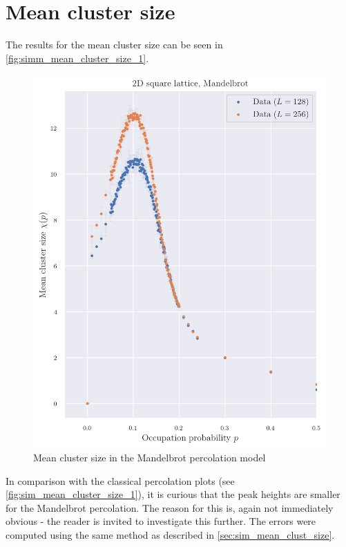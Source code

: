 \section{Mean cluster size}

The results for the mean cluster size can be seen in \autoref{fig:simm_mean_cluster_size_1}. 

\begin{figure}[H]
  \includegraphics[width=\linewidth]{Images/simm_mean_cluster_size_1.png}
  \caption{Mean cluster size in the Mandelbrot percolation model}
  \label{fig:simm_mean_cluster_size_1}
\end{figure}

In comparison with the classical percolation plots (see \autoref{fig:sim_mean_cluster_size_1}), it is curious that the peak heights are smaller for the Mandelbrot percolation. The reason for this is, again not immediately obvious - the reader is invited to investigate this further.
The errors were computed using the same method as described in \autoref{sec:sim_mean_clust_size}.

